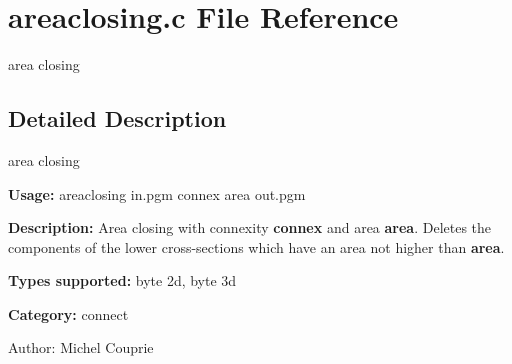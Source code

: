 \section{areaclosing.c File Reference}
\label{areaclosing_8c}
area closing  




\label{_details}
\subsection{Detailed Description}
area closing 

{\bf Usage:} areaclosing in.pgm connex area out.pgm

{\bf Description:} Area closing with connexity {\bf connex} and area {\bf area}. Deletes the components of the lower cross-sections which have an area not higher than {\bf area}.

{\bf Types supported:} byte 2d, byte 3d

{\bf Category:} connect

\begin{Desc}
\item[Author:]Michel Couprie \end{Desc}
